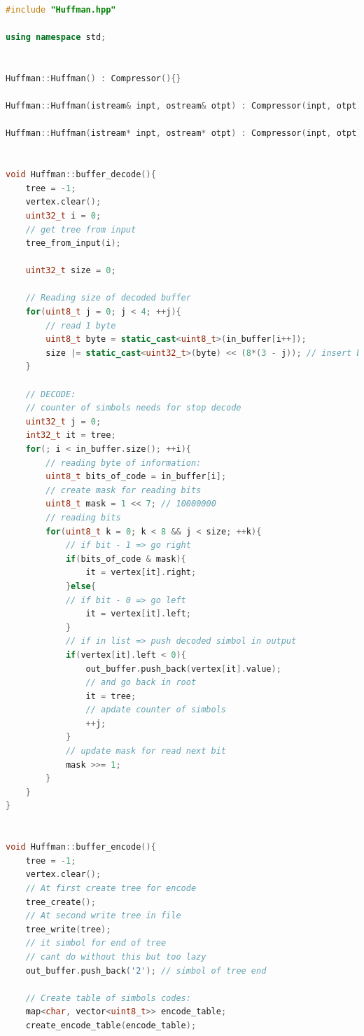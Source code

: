 \begin{lstlisting}[language=C++]
#include "Huffman.hpp"

using namespace std;


Huffman::Huffman() : Compressor(){}

Huffman::Huffman(istream& inpt, ostream& otpt) : Compressor(inpt, otpt){}

Huffman::Huffman(istream* inpt, ostream* otpt) : Compressor(inpt, otpt){}


void Huffman::buffer_decode(){
    tree = -1;
    vertex.clear();
    uint32_t i = 0;
    // get tree from input
    tree_from_input(i);

    uint32_t size = 0;

    // Reading size of decoded buffer
    for(uint8_t j = 0; j < 4; ++j){
        // read 1 byte
        uint8_t byte = static_cast<uint8_t>(in_buffer[i++]);
        size |= static_cast<uint32_t>(byte) << (8*(3 - j)); // insert bits on needed positions
    }

    // DECODE:
    // counter of simbols needs for stop decode
    uint32_t j = 0; 
    int32_t it = tree;
    for(; i < in_buffer.size(); ++i){
        // reading byte of information:
        uint8_t bits_of_code = in_buffer[i];
        // create mask for reading bits
        uint8_t mask = 1 << 7; // 10000000
        // reading bits
        for(uint8_t k = 0; k < 8 && j < size; ++k){
            // if bit - 1 => go right
            if(bits_of_code & mask){
                it = vertex[it].right;
            }else{
            // if bit - 0 => go left
                it = vertex[it].left;
            }
            // if in list => push decoded simbol in output
            if(vertex[it].left < 0){
                out_buffer.push_back(vertex[it].value);
                // and go back in root
                it = tree;
                // apdate counter of simbols
                ++j;
            }
            // update mask for read next bit
            mask >>= 1;
        }
    }
}


void Huffman::buffer_encode(){
    tree = -1;
    vertex.clear();
    // At first create tree for encode
    tree_create();
    // At second write tree in file
    tree_write(tree);
    // it simbol for end of tree 
    // cant do without this but too lazy
    out_buffer.push_back('2'); // simbol of tree end

    // Create table of simbols codes:
    map<char, vector<uint8_t>> encode_table;
    create_encode_table(encode_table);


\end{lstlisting}

